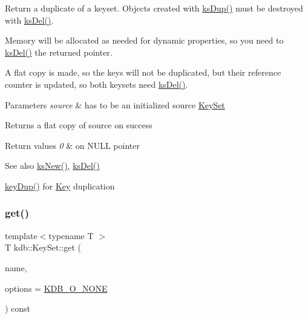Return a duplicate of a keyset. Objects created with \hyperlink{group__keyset_gac59e4b328245463f1451f68d5106151c}{ks\+Dup()} must be destroyed with \hyperlink{group__keyset_ga27e5c16473b02a422238c8d970db7ac8}{ks\+Del()}.

Memory will be allocated as needed for dynamic properties, so you need to \hyperlink{group__keyset_ga27e5c16473b02a422238c8d970db7ac8}{ks\+Del()} the returned pointer.

A flat copy is made, so the keys will not be duplicated, but their reference counter is updated, so both keysets need \hyperlink{group__keyset_ga27e5c16473b02a422238c8d970db7ac8}{ks\+Del()}.


\begin{DoxyParams}{Parameters}
{\em source} & has to be an initialized source \hyperlink{classkdb_1_1KeySet}{Key\+Set} \\
\hline
\end{DoxyParams}
\begin{DoxyReturn}{Returns}
a flat copy of source on success 
\end{DoxyReturn}

\begin{DoxyRetVals}{Return values}
{\em 0} & on N\+U\+LL pointer \\
\hline
\end{DoxyRetVals}
\begin{DoxySeeAlso}{See also}
\hyperlink{group__keyset_ga671e1aaee3ae9dc13b4834a4ddbd2c3c}{ks\+New()}, \hyperlink{group__keyset_ga27e5c16473b02a422238c8d970db7ac8}{ks\+Del()} 

\hyperlink{group__key_gae6ec6a60cc4b8c1463fa08623d056ce3}{key\+Dup()} for \hyperlink{group__key}{Key} duplication 
\end{DoxySeeAlso}
\mbox{\label{classkdb_1_1KeySet_a65208974b44da0162ef70dd7a173748f}} 
\subsubsection{\texorpdfstring{get()}{get()}}
{\footnotesize\ttfamily template$<$typename T $>$ \\
T kdb\+::\+Key\+Set\+::get (\begin{DoxyParamCaption}\item[{std\+::string const \&}]{name,  }\item[{const \hyperlink{group__keyset_gada05f4bbf46fde81d0d57df86e73d914}{elektra\+Lookup\+Flags}}]{options = {\ttfamily \hyperlink{group__keyset_ggada05f4bbf46fde81d0d57df86e73d914a00738455e0ae843c8720809d8287f370}{K\+D\+B\+\_\+\+O\+\_\+\+N\+O\+NE}} }\end{DoxyParamCaption}) const\hspace{0.3cm}{\ttfamily [inline]}}



